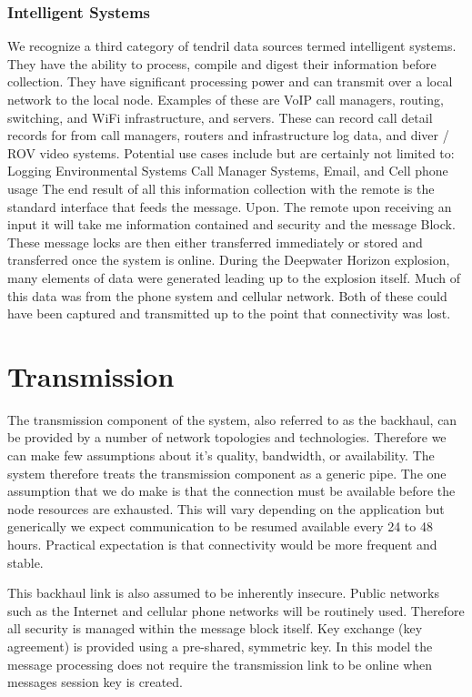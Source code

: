 \subsubsection{Intelligent Systems}
We recognize a third category of tendril data sources termed intelligent systems. They have the ability to process, compile and digest their information before collection. They have significant processing power and can transmit over a local network to the local node.  
Examples of these are VoIP call managers, routing, switching, and WiFi infrastructure, and servers.  These can record call detail records for from call managers, routers and infrastructure log data, and diver / ROV  \cite{Christ:2011vn} video systems.
Potential use cases include but are certainly not limited to: Logging Environmental Systems Call Manager Systems, Email, and Cell phone usage
The end result of all this information collection with the remote is the standard interface that feeds the message. Upon. The remote upon receiving an input it will take me information contained and security and the message Block. These message locks are then either transferred immediately or stored and transferred once the system is online.
During the Deepwater Horizon explosion, many elements of data were generated leading up to the explosion itself. 
Much of this data was from the phone system and cellular network. Both of these could have been captured and transmitted up to the point that connectivity was lost. 


\section{Transmission}
The transmission component of the system, also referred to as the backhaul, can be provided by a number of network topologies and technologies. Therefore we can make few assumptions about it’s quality, bandwidth, or availability. The system therefore treats the transmission component as a generic pipe. The one assumption that we do make is that the connection must be available before the node resources are exhausted. This will vary depending on the application but generically we expect communication to be resumed available every 24 to 48 hours. Practical expectation is that connectivity would be more frequent and stable.

This backhaul link is also assumed to be inherently insecure. Public networks such as the Internet and cellular phone networks will be routinely used. Therefore all security is managed within the message block itself. Key exchange (key agreement) is provided using a pre-shared, symmetric key. In this model the message processing does not require the transmission link to be online when messages session key is created.

